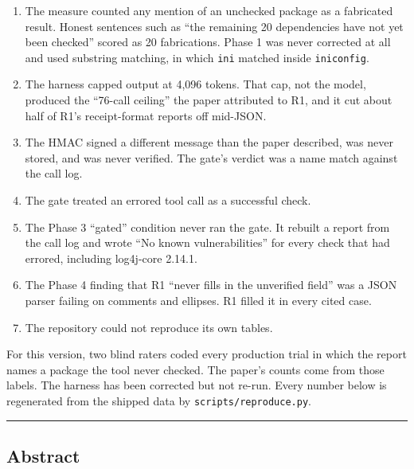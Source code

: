 \documentclass[
]{article}
\providecommand{\tightlist}{%
  \setlength{\itemsep}{0pt}\setlength{\parskip}{0pt}}
\begin{document}
\begin{enumerate}
\def\labelenumi{\arabic{enumi}.}
\tightlist
\item
  The measure counted any mention of an unchecked package as a
  fabricated result. Honest sentences such as ``the remaining 20
  dependencies have not yet been checked'' scored as 20 fabrications.
  Phase 1 was never corrected at all and used substring matching, in
  which \texttt{ini} matched inside \texttt{iniconfig}.
\item
  The harness capped output at 4,096 tokens. That cap, not the model,
  produced the ``76-call ceiling'' the paper attributed to R1, and it
  cut about half of R1's receipt-format reports off mid-JSON.
\item
  The HMAC signed a different message than the paper described, was
  never stored, and was never verified. The gate's verdict was a name
  match against the call log.
\item
  The gate treated an errored tool call as a successful check.
\item
  The Phase 3 ``gated'' condition never ran the gate. It rebuilt a
  report from the call log and wrote ``No known vulnerabilities'' for
  every check that had errored, including log4j-core 2.14.1.
\item
  The Phase 4 finding that R1 ``never fills in the unverified field''
  was a JSON parser failing on comments and ellipses. R1 filled it in
  every cited case.
\item
  The repository could not reproduce its own tables.
\end{enumerate}

For this version, two blind raters coded every production trial in which
the report names a package the tool never checked. The paper's counts
come from those labels. The harness has been corrected but not re-run.
Every number below is regenerated from the shipped data by
\texttt{scripts/reproduce.py}.

\begin{center}\rule{0.5\linewidth}{0.5pt}\end{center}

\subsection{Abstract}\label{abstract}
\end{document}
